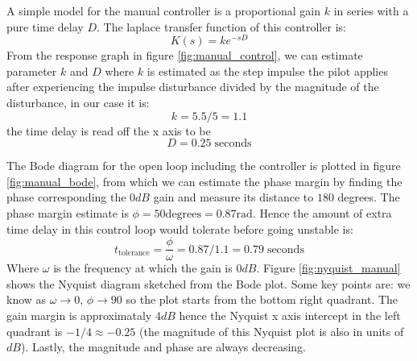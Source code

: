 \documentclass{article}
\begin{document}
A simple model for the manual controller is a proportional gain $k$ in series with a pure time delay $D$. The laplace transfer function of this controller is:
\begin{equation}
	K(s) = ke^{-sD}
\end{equation}
From the response graph in figure \ref{fig:manual_control}, we can estimate parameter $k$ and $D$ where $k$ is estimated as the step impulse the pilot applies after experiencing the impulse disturbance divided by the magnitude of the disturbance, in our case it is:
\begin{equation}
	k = 5.5/5=1.1
\end{equation}
the time delay is read off the x axis to be
\begin{equation}
	D = 0.25 \;\textrm{seconds}
\end{equation}

The Bode diagram for the open loop including the controller is plotted in figure \ref{fig:manual_bode}, from which we can estimate the phase margin by finding the phase corresponding the $0dB$ gain and measure its distance to $180$ degrees. The phase margin estimate is $\phi=50 \textrm{degrees} = 0.87\textrm{rad}$. Hence the amount of extra time delay in this control loop would tolerate before going unstable is:
\begin{equation}
	t_{\textrm{tolerance}} = \dfrac{\phi}{\omega} = 0.87/1.1 = 0.79 \;\textrm{seconds}
\end{equation}
Where $\omega$ is the frequency at which the gain is $0dB$. Figure \ref{fig:nyquist_manual} shows the Nyquist diagram sketched from the Bode plot. Some key points are: we know as $\omega \rightarrow 0$, $\phi \rightarrow 90$ so the plot starts from the bottom right quadrant. The gain margin is approximataly $4dB$ hence the Nyquist x axis intercept in the left quadrant is $-1/4 \approx -0.25$ (the magnitude of this Nyquist plot is also in units of $dB$). Lastly, the magnitude and phase are always decreasing.
\end{document}
